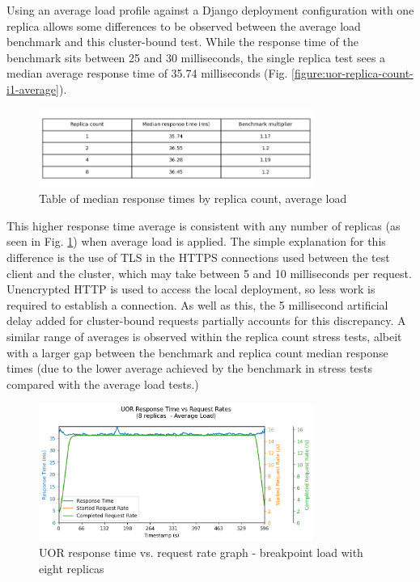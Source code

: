Using an average load profile against a Django deployment configuration with one replica allows some differences to be observed between the average load benchmark and this cluster-bound test. While the response time of the benchmark sits between 25 and 30 milliseconds, the single replica test sees a median average response time of 35.74 milliseconds (Fig. \ref{figure:uor-replica-count-i1-average}).

\begin{figure}[h]
    \centering
    \includegraphics[width=0.8\textwidth]{figures/uor-replica-count-rt-comparison.png}
    \caption{Table of median response times by replica count, average load}
    \label{figure:uor-replica-count-rt-comparison}
\end{figure}

This higher response time average is consistent with any number of replicas (as seen in Fig. \ref{figure:uor-replica-count-rt-comparison}) when average load is applied. The simple explanation for this difference is the use of TLS in the HTTPS connections used between the test client and the cluster, which may take between 5 and 10 milliseconds per request. Unencrypted HTTP is used to access the local deployment, so less work is required to establish a connection. As well as this, the 5 millisecond artificial delay added for cluster-bound requests partially accounts for this discrepancy. A similar range of averages is observed within the replica count stress tests, albeit with a larger gap between the benchmark and replica count median response times (due to the lower average achieved by the benchmark in stress tests compared with the average load tests.)

\begin{figure}[h]
    \centering
    \includegraphics[width=0.8\textwidth]{figures/uor-replica-count-i4-average.png}
    \caption{UOR response time vs. request rate graph - breakpoint load with eight replicas}
    \label{figure:uor-replica-count-i4-average}
\end{figure}


